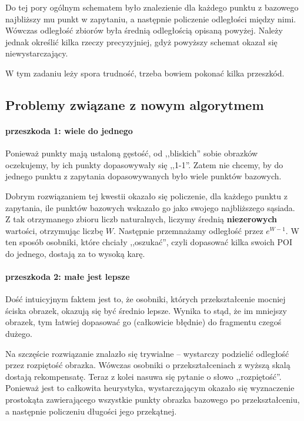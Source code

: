 \documentclass[a4paper,12pt,leqno]{article}
\begin{document}
Do tej pory ogólnym schematem było znalezienie dla każdego punktu z bazowego najbliższy mu punkt w zapytaniu, a następnie policzenie odległości między nimi.
Wówczas odległość zbiorów była średnią odległością opisaną powyżej.
Należy jednak określić kilka rzeczy precyzyjniej, gdyż powyższy schemat okazał się niewystarczający.

W tym zadaniu leży spora trudność, trzeba bowiem pokonać kilka przeszkód.

\subsection{Problemy związane z nowym algorytmem}
\paragraph{przeszkoda 1: wiele do jednego}
Ponieważ punkty mają ustaloną gęstość, od ,,bliskich'' sobie obrazków oczekujemy, by ich punkty dopasowywały się ,,1-1''. 
Zatem nie chcemy, by do jednego punktu z zapytania dopasowywanych było wiele punktów bazowych. 

Dobrym rozwiązaniem tej kwestii okazało się policzenie, dla każdego punktu z zapytania, ile punktów bazowych wskazało go jako swojego najbliższego sąsiada. 
Z tak otrzymanego zbioru liczb naturalnych, liczymy średnią \textbf{niezerowych} wartości, otrzymując liczbę $W$.
Następnie przemnażamy odległość przez $e^{W-1}$. W ten sposób osobniki, które chciały ,,oszukać'', czyli dopasować kilka swoich POI do jednego, dostają za to wysoką karę.


\paragraph{przeszkoda 2: małe jest lepsze}
Dość intuicyjnym faktem jest to, że osobniki, których przekształcenie mocniej ściska obrazek, okazują się być średnio lepsze. Wynika to stąd, że im mniejszy obrazek, 
tym łatwiej dopasować go (całkowicie błędnie) do fragmentu czegoś dużego. 

Na szczęście rozwiązanie znalazło się trywialne -- wystarczy podzielić odległość przez rozpiętość obrazka. Wówczas osobniki o przekształceniach z wyższą skalą dostają rekompensatę.
Teraz z kolei nasuwa się pytanie o słowo ,,rozpiętość''. Ponieważ jest to całkowita heurystyka, wystarczającym okazało się wyznaczenie prostokąta zawierającego wszystkie punkty 
obrazka bazowego po przekształceniu, a następnie policzeniu długości jego przekątnej.
\end{document}
